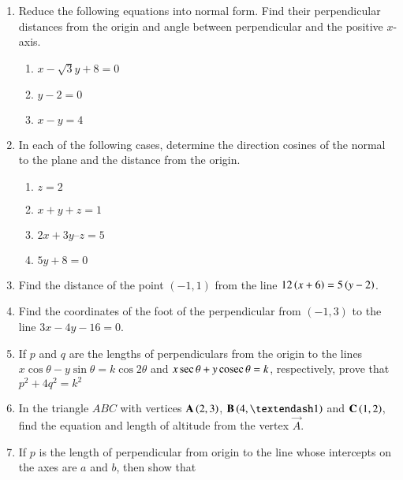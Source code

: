 \begin{enumerate}[label=\thesubsection.\arabic*,ref=\thesubsection.\theenumi]
\item  Reduce the following equations into normal form. Find their perpendicular distances from the origin and angle between perpendicular and the positive $x$-axis.
\label{chapters/11/10/3/3}
\begin{enumerate}
	\item $x-\sqrt{3}y+8=0$ 
	\item $y-2=0$
	\item $x-y=4$
\end{enumerate}
\solution

 \item  In each of the following cases, determine the direction cosines of the normal to
the plane and the distance from the origin.
\begin{enumerate}
	\item $z=2$ 
	\item $x + y + z = 1$
	\item $2x + 3y – z = 5$
	\item $5y + 8 = 0$
\end{enumerate}
    \solution
		
\item Find the distance of the point $(-1,1)$ from the line $12\left(x+6\right) = 5\left(y-2\right)$. 
\label{chapters/11/10/3/4}
	\\
\solution 

\item Find the coordinates of the foot of the perpendicular from $(-1, 3)$ to the line $3x-4y-16=0$.  
\label{chapters/11/10/3/14}
\\
\solution

\item  If ${p}$ and ${q}$ are the lengths of perpendiculars from the origin to the lines ${x}\cos\theta - {y}\sin\theta =  {k}\cos2\theta$ and ${x}\sec\theta + {y}\,\text{cosec}\,\theta = {k}$, respectively, prove that ${p}^2 + 4{q}^2 = {k}^2$
\label{chapters/11/10/3/16}
\\
\solution

\item In the triangle $ABC$ with vertices $\mathbf{A} \left(2, 3\right)$, $\vec{B} \brak{4, –1}$ and $\mathbf{C} \left(1, 2\right)$, find the equation and length of altitude from the vertex $\vec{A}$.
\label{chapters/11/10/3/17}
\\
\solution

\item If $p$ is the length of perpendicular from origin to the line whose intercepts on the axes are $a$ and $b$, then show that 

\end{enumerate}
